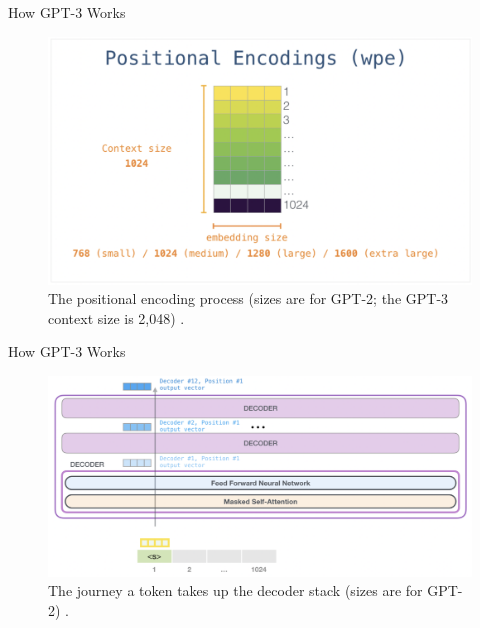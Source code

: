 \documentclass{beamer}
\begin{document}
\begin{frame}{How GPT-3 Works}
    \begin{figure}
        \centering
        \includegraphics[scale=0.45]{gpt3_positional_encodings}
        \caption{The positional encoding process (sizes are for GPT-2; the GPT-3 context size is 2,048)  \cite{alammar2019}.}
        \label{fig:gpt3_positional_encodings}
    \end{figure}
\end{frame}

\begin{frame}{How GPT-3 Works}
    \begin{figure}
        \centering
        \includegraphics[scale=0.35]{gpt3_stack_journey}
        \caption{The journey a token takes up the decoder stack (sizes are for GPT-2) \cite{alammar2019}.}
        \label{fig:gpt3_stack_journey}
    \end{figure}
\end{frame}
\end{document}
